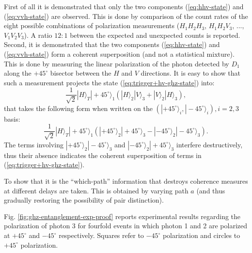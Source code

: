 First of all it is demonstrated that only the two components (\ref{eq:hhv-state}) and (\ref{eq:vvh-state}) are observed. This is done by comparison of the count rates of the eight possible combinations of polarization measurements ($H_1 H_2 H_3$, $H_1 H_2 V_3$, ..., $V_1 V_2 V_3$). A ratio $12:1$ between the expected and unexpected counts is reported. Second, it is demonstrated that the two components (\ref{eq:hhv-state}) and (\ref{eq:vvh-state}) form a coherent superposition (and not a statistical mixture). This is done by measuring the linear polarization of the photon detected by $D_1$ along the $+ 45^\circ$ bisector between the $H$ and $V$ directions. It is easy to show that such a measurement projects the state (\ref{eq:trigger+hv-ghz-state}) into:
\begin{equation*}
  \frac{1}{\sqrt{2}} |H\rangle_T |+ 45^\circ\rangle_1 \left( |H\rangle_2 |V\rangle_3 + |V\rangle_2 |H\rangle_3 \right),
\end{equation*}
that takes the following form when written on the $( |+ 45^\circ\rangle_i, |- 45^\circ\rangle_i), i = 2, 3$ basis:
\begin{equation*}
  \frac{1}{\sqrt{2}} |H\rangle_T |+ 45^\circ\rangle_1 \left( |+ 45^\circ\rangle_2 |+ 45^\circ\rangle_3 - |- 45^\circ\rangle_2 |- 45^\circ\rangle_3 \right).
\end{equation*}
The terms involving $|+ 45^\circ\rangle_2 |- 45^\circ\rangle_3$ and $|- 45^\circ\rangle_2 |+ 45^\circ\rangle_3$ interfere destructively, thus their absence indicates the coherent superposition of terms in (\ref{eq:trigger+hv-ghz-state}).

To show that it is the ``which-path'' information that destroys coherence measures at different delays are taken. This is obtained by varying path $a$ (and thus gradually restoring the possibility of pair distinction).

Fig. \ref{fig:ghz-entanglement-exp-proof} reports experimental results regarding the polarization of photon 3 for fourfold events in which photon 1 and 2 are polarized at $+ 45^\circ$ and $- 45^\circ$ respectively. Squares refer to $- 45^\circ$ polarization and circles to $+ 45^\circ$ polarization.

